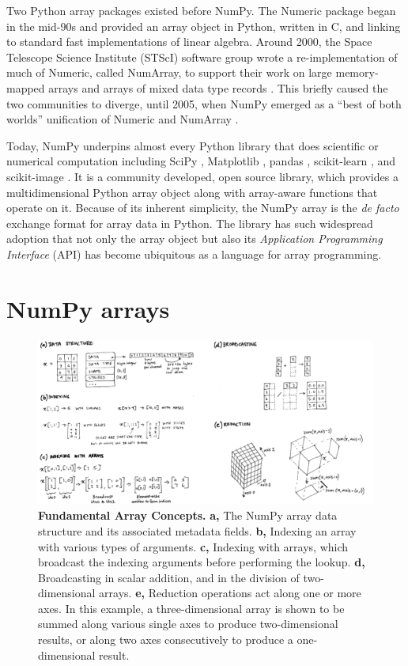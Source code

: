 Two Python array packages existed before NumPy.
The Numeric package began in the mid-90s and provided an array object in
Python, written in C, and linking to standard fast implementations of linear
algebra.
Around 2000, the Space Telescope Science Institute (STScI) software group wrote
a re-implementation of much of Numeric, called NumArray, to support their work
on large memory-mapped arrays and arrays of mixed data type
records \cite{STScI-slither}.
This briefly caused the two communities to diverge, until
2005, when NumPy emerged as a ``best of both worlds'' unification of Numeric
and NumArray \cite{oliphant2006guide}.

Today, NumPy underpins almost every Python library that does scientific or
numerical computation including SciPy \cite{virtanen2019scipy},
Matplotlib \cite{hunter2007matplotlib}, pandas \cite{mckinney-proc-scipy-2010},
scikit-learn \cite{pedregosa2011scikit}, and
scikit-image \cite{vanderwalt2014scikit}.
It is a community developed, open source library, which provides a
multidimensional Python array object along with array-aware functions
that operate on it.
Because of its inherent simplicity, the NumPy array is
the {\it de facto} exchange format for array data in Python.
The library has such widespread adoption that not only the array object but also its
{\it Application Programming Interface} (API) has become ubiquitous as
a language for array programming.

\section*{NumPy arrays}

\begin{figure}
  \centering
  \includegraphics[width=\textwidth]{static/sketches/array-concepts}   
  \caption{\textbf{Fundamental Array Concepts.}
    \textbf{a,} The NumPy array data structure and its associated metadata fields.
    \textbf{b,} Indexing an array with various types of arguments.
    \textbf{c,} Indexing with arrays, which broadcast the indexing arguments before performing the lookup.
    \textbf{d,} Broadcasting in scalar addition, and in the division of two-dimensional arrays.
    \textbf{e,} Reduction operations act along one or more axes. In this
    example, a three-dimensional array is shown to be summed along various single
    axes to produce two-dimensional results, or along two axes consecutively to
    produce a one-dimensional result.
   }
  \label{fig:array-concepts}
\end{figure}

